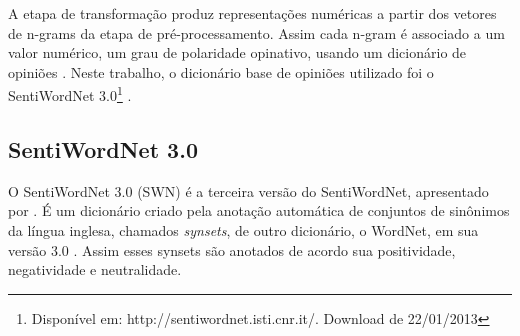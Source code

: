 A etapa de transformação produz representações numéricas a partir dos vetores de n-grams da etapa de pré-processamento. Assim cada n-gram é associado a um valor numérico, um grau de polaridade opinativo, usando um dicionário de opiniões \cite{ballhysa2012fuzzy, moraes2012document, mouthami2013sentiment}. Neste trabalho, o dicionário base de opiniões utilizado  foi o SentiWordNet 3.0\footnote{Disponível em: http://sentiwordnet.isti.cnr.it/. Download de 22/01/2013} \cite{baccianella2010sentiwordnet}.

\subsection{SentiWordNet 3.0}

O SentiWordNet 3.0 (SWN) é a terceira versão do SentiWordNet, apresentado por \cite{esuli2006sentiwordnet}. É um dicionário criado pela anotação automática de conjuntos de sinônimos da língua inglesa, chamados \textit{synsets}, de outro dicionário, o WordNet, em sua versão 3.0 \cite{fellbaum2005wordnet}. Assim esses synsets são anotados de acordo sua positividade, negatividade e neutralidade. 

